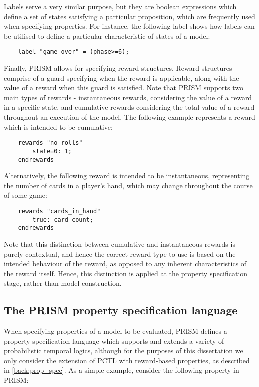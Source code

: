 Labels serve a very similar purpose, but they are boolean expressions which define a set of states satisfying a particular proposition, which are frequently used when specifying properties. For instance, the following label shows how labels can be utilised to define a particular characteristic of states of a model:

\begin{verbatim}
    label "game_over" = (phase>=6);
\end{verbatim}

Finally, PRISM allows for specifying reward structures. Reward structures comprise of a guard specifying when the reward is applicable, along with the value of a reward when this guard is satisfied. Note that PRISM supports two main types of rewards - instantaneous rewards, considering the value of a reward in a specific state, and cumulative rewards considering the total value of a reward throughout an execution of the model.  The following example represents a reward which is intended to be cumulative:

\begin{verbatim}
    rewards "no_rolls"
        state=0: 1;
    endrewards
\end{verbatim}

Alternatively, the following reward is intended to be instantaneous, representing the number of cards in a player's hand, which may change throughout the course of some game:

\begin{verbatim}
    rewards "cards_in_hand"
        true: card_count;
    endrewards
\end{verbatim}

Note that this distinction between cumulative and instantaneous rewards is purely contextual, and hence the correct reward type to use is based on the intended behaviour of the reward, as opposed to any inherent characteristics of the reward itself. Hence, this distinction is applied at the property specification stage, rather than model construction.



\subsection{The PRISM property specification language}
\label{back:PRISM-prop}

When specifying properties of a model to be evaluated, PRISM defines a property specification language which supports and extends a variety of probabilistic temporal logics, although for the purposes of this dissertation we only consider the extension of PCTL with reward-based properties, as described in \ref{back:prop_spec}. As a simple example, consider the following property in PRISM:

